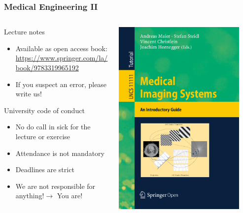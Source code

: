 \begin{frame}
	\frametitle{Medical Engineering II}
	\begin{columns}[c, onlytextwidth]
		\begin{column}{0.6\textwidth}
			\begin{block}{Lecture notes}
				\begin{itemize}
					\item Available as open access book: \url{https://www.springer.com/la/book/9783319965192}
					\item If you suspect an error, please write us!
				\end{itemize}
			\end{block}
			\begin{block}{University code of conduct}
				\begin{itemize}
					\item No do call in sick for the lecture or exercise
					\item Attendance is not mandatory
					\item Deadlines are strict
					\item We are not responsible for anything!\newline $\rightarrow$ You are!
				\end{itemize}
			\end{block}
		\end{column}\begin{column}{0.3\textwidth}
			\href{https://www.springer.com/la/book/9783319965192}{\includegraphics[width=0.9\textwidth]{Bilder/book_cover.png}}

\end{column}
\end{columns}
\end{frame}
